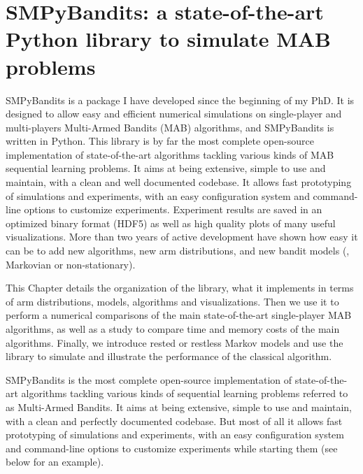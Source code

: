 
\chapter{SMPyBandits: a state-of-the-art Python library to simulate MAB problems}
\label{chapter:3}
\minitoc

SMPyBandits is a package I have developed since the beginning of my PhD.
It is designed to allow easy and efficient numerical simulations on single-player and multi-players Multi-Armed Bandits (MAB) algorithms, and SMPyBandits is written in Python.
This library is by far the most complete open-source implementation of state-of-the-art algorithms tackling various kinds of MAB sequential learning problems.
It aims at being extensive, simple to use and maintain, with a clean and well documented codebase.
It allows fast prototyping of simulations and experiments, with an easy configuration system and command-line options to customize experiments.
Experiment results are saved in an optimized binary format (HDF5) as well as high quality plots of many useful visualizations.
%
More than two years of active development have shown how easy it can be to add new algorithms, new arm distributions, and new bandit models (\eg, Markovian or non-stationary).

This Chapter details the organization of the library, what it implements in terms of arm distributions, models, algorithms and visualizations.
Then we use it to perform a numerical comparisons of the main state-of-the-art single-player MAB algorithms, as well as a study to compare time and memory costs of the main algorithms.
Finally, we introduce rested or restless Markov models and use the library to simulate and illustrate the performance of the classical \UCB{} algorithm.

\newpage
\graphicspath{{2-Chapters/3-Chapter/Images/}}
\graphicspath{{2-Chapters/3-Chapter/SMPyBandits_paper.git/plots/}}


SMPyBandits is the most complete open-source implementation of state-of-the-art algorithms tackling various kinds of sequential learning problems referred to as Multi-Armed Bandits.
It aims at being extensive, simple to use and maintain, with a clean and perfectly documented codebase. But most of all it allows fast prototyping of simulations and experiments, with an easy configuration system and command-line options to customize experiments while starting them (see below for an example).

